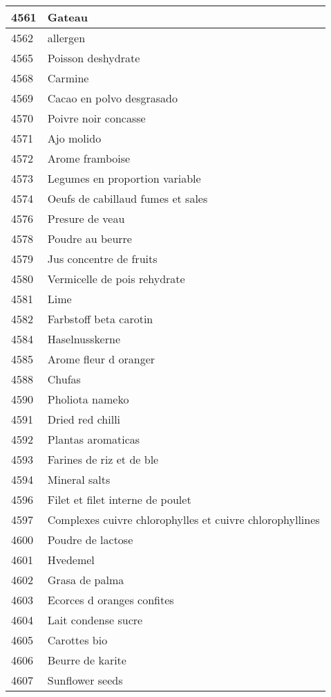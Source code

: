 \begin{longtable}{|l|l|}
4561 & Gateau \\ \hline 
4562 & allergen \\ \hline 
4565 & Poisson deshydrate \\ \hline 
4568 & Carmine \\ \hline 
4569 & Cacao en polvo desgrasado \\ \hline 
4570 & Poivre noir concasse \\ \hline 
4571 & Ajo molido \\ \hline 
4572 & Arome framboise \\ \hline 
4573 & Legumes en proportion variable \\ \hline 
4574 & Oeufs de cabillaud fumes et sales \\ \hline 
4576 & Presure de veau \\ \hline 
4578 & Poudre au beurre \\ \hline 
4579 & Jus concentre de fruits \\ \hline 
4580 & Vermicelle de pois rehydrate \\ \hline 
4581 & Lime \\ \hline 
4582 & Farbstoff beta carotin \\ \hline 
4584 & Haselnusskerne \\ \hline 
4585 & Arome fleur d oranger \\ \hline 
4588 & Chufas \\ \hline 
4590 & Pholiota nameko \\ \hline 
4591 & Dried red chilli \\ \hline 
4592 & Plantas aromaticas \\ \hline 
4593 & Farines de riz et de ble \\ \hline 
4594 & Mineral salts \\ \hline 
4596 & Filet et filet interne de poulet \\ \hline 
4597 & Complexes cuivre chlorophylles et cuivre chlorophyllines \\ \hline 
4600 & Poudre de lactose \\ \hline 
4601 & Hvedemel \\ \hline 
4602 & Grasa de palma \\ \hline 
4603 & Ecorces d oranges confites \\ \hline 
4604 & Lait condense sucre \\ \hline 
4605 & Carottes bio \\ \hline 
4606 & Beurre de karite \\ \hline 
4607 & Sunflower seeds \\ \hline 

\end{longtable}
